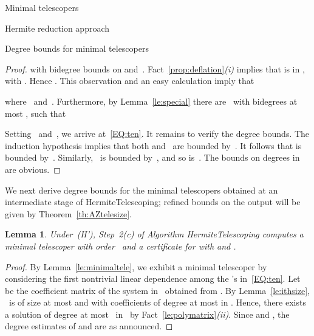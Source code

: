 \documentclass{sig-alt-full}
\newtheorem{lemma}{Lemma}
\begin{document}
\begin{section}{Minimal telescopers}
\begin{subsection}{Hermite reduction approach}
\begin{subsubsection}{Degree bounds for minimal telescopers}
\begin{proof}
with bidegree bounds on  and~.
Fact~\ref{prop:deflation}\emph{(i)\/} implies that  is in , with
.
Hence .
This observation and an easy calculation imply that

where~ and~.
Furthermore, by Lemma~\ref{le:special}
there are~ with bidegrees at most
, such that

Setting~ and~, we
arrive at~\eqref{EQ:ten}.
It remains to verify the degree bounds.
The induction hypothesis implies that
both  and~ are bounded by~.
It follows that  is
bounded by~.
Similarly,~ is bounded by~, and so is~.
The bounds on degrees in~ are obvious.
\end{proof}

We next derive degree bounds for the minimal telescopers
obtained at an intermediate stage of \textsf{HermiteTelescoping};
refined bounds on the output will be given by Theorem~\ref{th:AZtelesize}.

\begin{lemma}
Under~(H'), Step~2(c) of Algorithm \textsf{Hermite\-Telescoping} computes
a minimal telescoper  with order~
and a certificate  for  with  and .
\end{lemma}

\begin{proof}
By Lemma~\ref{le:minimaltele}, we exhibit a minimal telescoper
by considering the first nontrivial linear dependence among the
's in~\eqref{EQ:ten}.
Let  be the coefficient matrix of the system in~
obtained from .
By Lemma~\ref{le:ithsize}, ~is of size at most
 and with coefficients of degree at most
 in .
Hence, there exists a solution
 of degree at
most~ in~ by
Fact~\ref{le:polymatrix}\emph{(ii)}.
Since  and , the degree estimates of
 and  are as announced.
\end{proof}
\end{subsubsection}

\begin{figure}
\end{figure}
\end{subsection}
\end{section}
\end{document}
